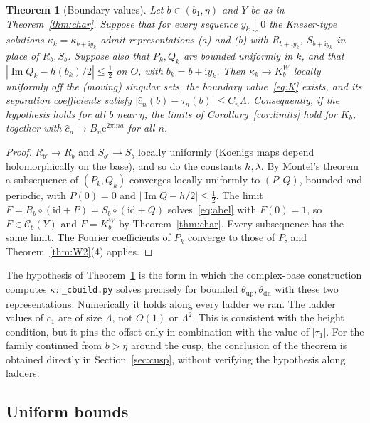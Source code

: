 \documentclass[11pt]{amsart}
\newtheorem{theorem}{Theorem}[section]
\theoremstyle{definition}
\newcommand{\Rr}{R}
\newcommand{\Kk}{K}
\newcommand{\eee}{\mathrm{e}}
\newcommand{\ii}{\mathrm{i}}
\begin{document}
\begin{theorem}[Boundary values]\label{thm:bv}
Let $b\in(b_1,\eta)$ and $Y$ be as in Theorem~\ref{thm:char}.  Suppose that for
every sequence $y_k\downarrow0$ the Kneser-type solutions $\kappa_k=\kappa_{b+\ii y_k}$
admit representations (a) and (b) with $\Rr_{b+\ii y_k}$, $S_{b+\ii y_k}$ in
place of $\Rr_b,S_b$.  Suppose also that $P_k,Q_k$ are bounded uniformly in
$k$, and that $|\operatorname{Im}Q_k-h(b_k)/2|\le\tfrac12$ on $O$, with $b_k=b+\ii y_k$.  Then
$\kappa_k\to\Kk^W_b$ locally uniformly off the (moving) singular sets, the boundary
value~\eqref{eq:K} exists, and its separation coefficients
satisfy $|\hat c_n(b)-\tau_n(b)|\le C_n\Lambda$.  Consequently, if the
hypothesis holds for all $b$ near $\eta$,
the limits of Corollary~\ref{cor:limits} hold for $\Kk_b$, together with
$\hat c_n\to B_n\eee^{2\pi\ii na}$ for all $n$.
\end{theorem}

\begin{proof}
$\Rr_{b'}\to\Rr_b$ and $S_{b'}\to S_b$ locally uniformly (Koenigs maps depend
holomorphically on the base), and so do the constants $h,\lambda$.  By
Montel's theorem a subsequence of $(P_k,Q_k)$ converges locally uniformly to
$(P,Q)$, bounded and periodic, with $P(0)=0$ and
$|\operatorname{Im}Q-h/2|\le\tfrac12$.  The limit
$F=\Rr_b\circ(\mathrm{id}+P)=S_b\circ(\mathrm{id}+Q)$ solves~\eqref{eq:abel}
with $F(0)=1$, so $F\in\mathcal C_b(Y)$ and $F=\Kk^W_b$ by
Theorem~\ref{thm:char}.  Every subsequence has the same limit.  The Fourier
coefficients of $P_k$ converge to those of $P$, and Theorem~\ref{thm:W2}(4)
applies.
\end{proof}

\noindent
The hypothesis of Theorem~\ref{thm:bv} is the form in which the complex-base
construction computes $\kappa$: \texttt{\_cbuild.py} solves precisely for
bounded $\theta_{\mathrm{up}},\theta_{\mathrm{dn}}$ with these two
representations.  Numerically it holds along every ladder we ran.  The ladder
values of $c_1$ are of size $\Lambda$, not $O(1)$ or $\Lambda^2$.  This is
consistent with the height condition, but it pins the offset only in
combination with the value of $|\tau_1|$.  For the family continued from $b>\eta$ around the cusp, the conclusion of
the theorem is obtained directly in Section~\ref{sec:cusp}, without verifying
the hypothesis along ladders.

\subsection{Uniform bounds}\label{sec:unif}
\end{document}
